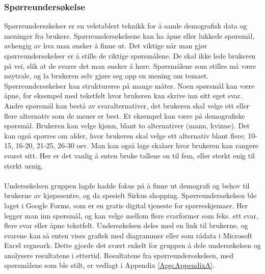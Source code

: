 \subsubsection{Spørreundersøkelse}
Spørreundersøkelser er en veletablert teknikk for å samle demografisk data og meninger fra brukere\cite[s.~244]{preece}. Spørreundersøkelsene kan ha åpne eller lukkede spørsmål, avhengig av hva man ønsker å finne ut. Det viktige når man gjør spørreundersøkelser er å stille de riktige spørsmålene. De skal ikke lede brukeren på vei, slik at de svarer det man ønsker å høre. Spørsmålene som stilles må være nøytrale, og la brukeren selv gjøre seg opp en mening om temaet.
Spørreundersøkelser kan struktureres på mange måter. Noen spørsmål kan være åpne, for eksempel med tekstfelt hvor brukeren kan skrive inn sitt eget svar. Andre spørsmål kan bestå av svaralternativer, det brukeren skal velge ett eller flere alternativ som de mener er best. Et eksempel kan være på demografiske spørsmål\cite[s.~245]{preece}. Brukeren kan velge kjønn, blant to alternativer (mann, kvinne). Det kan også spørres om alder, hvor brukeren skal velge ett alternativ blant flere; 10-15, 16-20, 21-25, 26-30 osv. Man kan også lage skalaer hvor brukeren kan rangere svaret sitt. Her er det vanlig å enten bruke tallene en til fem, eller sterkt enig til sterkt uenig.
\\\\
Undersøkelsen gruppen lagde hadde fokus på å finne ut demografi og behov til brukerne av kjøpesentre, og da spesielt Sirkus shopping. Spørreundersøkelsen ble laget i Google Forms, som er en gratis digital tjeneste for spørreskjemaer. Her legger man inn spørsmål, og kan velge mellom flere svarformer som feks. ett svar, flere svar eller åpne tekstfelt. Undersøkelsen deles med en link til brukerne, og svarene kan så enten vises grafisk med diagrammer eller som rådata i Microsoft Excel regneark. Dette gjorde det svært enkelt for gruppen å dele undersøkelsen og analysere resultatene i ettertid. Resultatene fra spørreundersøkelsen, med spørsmålene som ble stilt, er vedlagt i Appendix \ref{App:AppendixA}.
\\\\
